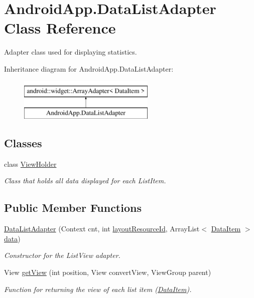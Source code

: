 \hypertarget{class_android_app_1_1_data_list_adapter}{}\section{Android\+App.\+Data\+List\+Adapter Class Reference}
\label{class_android_app_1_1_data_list_adapter}


Adapter class used for displaying statistics.  


Inheritance diagram for Android\+App.\+Data\+List\+Adapter\+:\begin{figure}[H]
\begin{center}
\leavevmode
\includegraphics[height=2.000000cm]{class_android_app_1_1_data_list_adapter}
\end{center}
\end{figure}
\subsection*{Classes}
\begin{DoxyCompactItemize}
\item 
class \hyperlink{class_android_app_1_1_data_list_adapter_1_1_view_holder}{View\+Holder}
\begin{DoxyCompactList}\small\item\em Class that holds all data displayed for each List\+Item. \end{DoxyCompactList}\end{DoxyCompactItemize}
\subsection*{Public Member Functions}
\begin{DoxyCompactItemize}
\item 
\hyperlink{class_android_app_1_1_data_list_adapter_a654a6659bcdfdd08be0d7684269c1750}{Data\+List\+Adapter} (Context cnt, int \hyperlink{class_android_app_1_1_data_list_adapter_ac4680f2696f50995ecd43fa418f15524}{layout\+Resource\+Id}, Array\+List$<$ \hyperlink{class_android_app_1_1_data_item}{Data\+Item} $>$ \hyperlink{class_android_app_1_1_data_list_adapter_a733766e9ddd9f1cc3943dd83fc734c59}{data})
\begin{DoxyCompactList}\small\item\em Constructor for the List\+View adapter. \end{DoxyCompactList}\item 
View \hyperlink{class_android_app_1_1_data_list_adapter_acb1d33ad30608fff808765c10050f9c3}{get\+View} (int position, View convert\+View, View\+Group parent)
\begin{DoxyCompactList}\small\item\em Function for returning the view of each list item (\hyperlink{class_android_app_1_1_data_item}{Data\+Item}). \end{DoxyCompactList}\end{DoxyCompactItemize}
